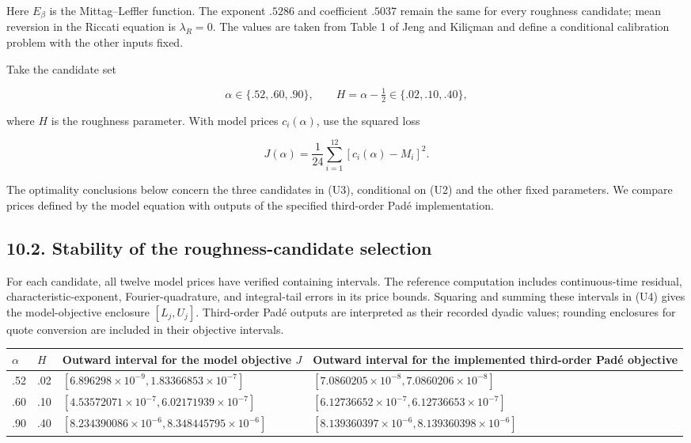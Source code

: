 \documentclass[a4paper,11pt]{article}
\begin{document}
Here $E_\beta$ is the Mittag–Leffler function. The exponent $.5286$ and coefficient $.5037$ remain the same for every roughness candidate; mean reversion in the Riccati equation is $\lambda_R=0$. The values are taken from Table 1 of Jeng and Kiliçman and define a conditional calibration problem with the other inputs fixed.

Take the candidate set

\[
\alpha\in\{.52,.60,.90\},\qquad
H=\alpha-\tfrac12\in\{.02,.10,.40\},
\tag{U3}
\]

where $H$ is the roughness parameter. With model prices $c_i(\alpha)$, use the squared loss

\[
J(\alpha)=\frac1{24}\sum_{i=1}^{12}[c_i(\alpha)-M_i]^2.
\tag{U4}
\]

The optimality conclusions below concern the three candidates in (U3), conditional on (U2) and the other fixed parameters. We compare prices defined by the model equation with outputs of the specified third-order Padé implementation.

\subsection*{10.2. Stability of the roughness-candidate selection}

For each candidate, all twelve model prices have verified containing intervals. The reference computation includes continuous-time residual, characteristic-exponent, Fourier-quadrature, and integral-tail errors in its price bounds. Squaring and summing these intervals in (U4) gives the model-objective enclosure $[L_j,U_j]$. Third-order Padé outputs are interpreted as their recorded dyadic values; rounding enclosures for quote conversion are included in their objective intervals.

\begingroup\scriptsize\setlength{\tabcolsep}{3pt}
\begin{longtable}{L{0.222500\textwidth}L{0.222500\textwidth}L{0.222500\textwidth}L{0.222500\textwidth}}
$\alpha$ & $H$ & Outward interval for the model objective $J$ & Outward interval for the implemented third-order Padé objective\\
\hline
.52 & .02 & $[6.896298\times10^{-9},1.83366853\times10^{-7}]$ & $[7.0860205\times10^{-8},7.0860206\times10^{-8}]$\\
.60 & .10 & $[4.53572071\times10^{-7},6.02171939\times10^{-7}]$ & $[6.12736652\times10^{-7},6.12736653\times10^{-7}]$\\
.90 & .40 & $[8.234390086\times10^{-6},8.348445795\times10^{-6}]$ & $[8.139360397\times10^{-6},8.139360398\times10^{-6}]$\\
\end{longtable}\endgroup
\end{document}
